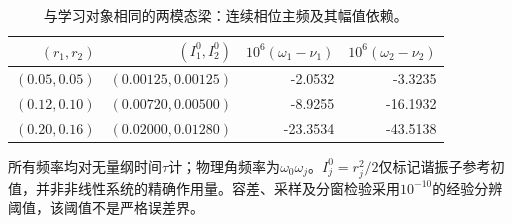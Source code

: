 \begin{table}[t]
\centering\small
\caption{与学习对象相同的两模态梁：连续相位主频及其幅值依赖。}
\label{table:beam_kam}
\begin{tabular}{rrrr}
\toprule
$(r_1,r_2)$ & $(I_1^0,I_2^0)$ & $10^6(\omega_1-\nu_1)$ & $10^6(\omega_2-\nu_2)$ \\
\midrule
$(0.05,0.05)$ & $(0.00125,0.00125)$ & -2.0532 & -3.3235 \\
$(0.12,0.10)$ & $(0.00720,0.00500)$ & -8.9255 & -16.1932 \\
$(0.20,0.16)$ & $(0.02000,0.01280)$ & -23.3534 & -43.5138 \\
\bottomrule
\end{tabular}
\par\smallskip
\begin{minipage}{0.96\textwidth}\footnotesize
所有频率均对无量纲时间$\tau$计；物理角频率为$\omega_0\omega_j$。$I_j^0=r_j^2/2$仅标记谐振子参考初值，并非非线性系统的精确作用量。容差、采样及分窗检验采用$10^{-10}$的经验分辨阈值，该阈值不是严格误差界。
\end{minipage}
\end{table}
